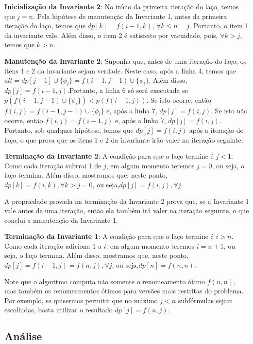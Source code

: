 \textbf{Inicialização da Invariante 2}: No início da primeira iteração do laço, temos que $j = n$. Pela hipótese de manutenção da Invariante 1, antes da primeira iteração do laço, temos que $dp[k] = f(i-1,k)$, $\forall k \leq n = j$. Portanto, o item 1 da invariante vale. Além disso, o item 2 é satisfeito por vacuidade, pois, $\forall k > j$, temos que $k > n$.

\textbf{Manutenção da Invariante 2}: Suponha que, antes de uma iteração do laço, os itens 1 e 2 da invariante sejam verdade. Neste caso, após a linha 4, temos que\break $alt = dp[j-1] \cup \{\phi_i \} = f(i-1,j-1) \cup \{\phi_i \}$. Além disso, $dp[j] = f(i-1,j)$.\break Portanto, a linha 6 só será executada se $p(f(i-1,j-1) \cup \{\phi_i \}) < p(f(i-1,j))$. Se isto ocorre, então $f(i,j) = f(i-1,j-1) \cup \{\phi_i \}$ e, após a linha 7, $dp[j] = f(i,j)$. Se isto não ocorre, então $f(i,j) = f(i-1,j)$ e, após a linha 7, $dp[j] = f(i,j)$. Portanto, sob qualquer hipótese, temos que $dp[j] = f(i,j)$ após a iteração do laço, o que prova que os itens 1 e 2 da invariante irão valer na iteração seguinte.

\textbf{Terminação da Invariante 2}: A condição para que o laço termine é $j < 1$. Como cada iteração subtrai 1 de $j$, em algum momento teremos $j = 0$, ou seja, o laço termina. Além disso, mostramos que, neste ponto, $dp[k] = f(i,k), \forall k > j = 0$, ou seja,\break $dp[j] = f(i,j), \forall j$.

A propriedade provada na terminação da Invariante 2 prova que, se a Invariante 1 vale antes de uma iteração, então ela também irá valer na iteração seguinte, o que conclui a manutenção da Invariante 1.

\textbf{Terminação da Invariante 1}: A condição para que o laço termine é $i > n$. Como cada iteração adiciona 1 a $i$, em algum momento teremos $i = n+1$, ou seja, o laço termina. Além disso, mostramos que, neste ponto, $dp[j] = f(i-1,j) = f(n,j), \forall j$, ou seja,\break $dp[n] = f(n,n)$.

Note que o algoritmo computa não somente o renomeamento ótimo $f(n,n)$, mas também os renomeamentos ótimos para versões mais restritas do problema. Por exemplo, se quisermos permitir que no máximo $j < n$ subfórmulas sejam escolhidas, basta utilizar o resultado $dp[j] = f(n,j)$.

\subsection{Análise}

